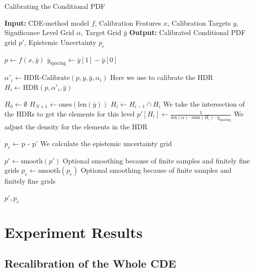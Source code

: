 \begin{algorithm}
    \caption{Calibrating the Conditional PDF}
    \label{alg:calibrate_pdf}
    \begin{algorithmic}
        \STATE \textbf{Input:} CDE-method model $f$, Calibration Features $x$, Calibration Targets $y$, Significance Level Grid $\alpha$, Target Grid $\bar{y}$
        \STATE \textbf{Output:} Calibrated Conditional PDF grid $p'$, Epistemic Uncertainty $p_e$
        
        \STATE $p \leftarrow f(x, \bar{y})$
        \STATE $\bar{y}_{\text{spacing}} \leftarrow \bar{y}[1] - \bar{y}[0]$

            \STATE $\alpha'_i \leftarrow \text{HDR-Calibrate}(p, y, \bar{y}, \alpha_i)$ Here we use  to calibrate the HDR
            \STATE $H_i \leftarrow \text{HDR}(p, \alpha'_i, \bar{y})$
        \ENDFOR

        \STATE $H_0 \leftarrow \emptyset$
        \STATE $H_{N+1} \leftarrow \text{ones}(\text{len}(\bar{y}))$
            \STATE $H_i \leftarrow H_{i - 1} \cap H_i$ We take the intersection of the HDRs to get the elements for this level
            \STATE $p'[H_i] \leftarrow \frac{1}{\text{len}(\alpha) \cdot \text{sum}(H_i) \cdot \bar{y}_{\text{spacing}}}$ We adjust the density for the elements in the HDR
        \ENDFOR
        
        \STATE $p_e \leftarrow \text{p - p'}$ We calculate the epistemic uncertainty grid

        \STATE $p' \leftarrow \text{smooth}(p')$ Optional smoothing because of finite samples and finitely fine grids
        \STATE $p_e \leftarrow \text{smooth}(p_e)$ Optional smoothing because of finite samples and finitely fine grids
        
        \RETURN $p', p_e$
    \end{algorithmic}
\end{algorithm}



\section{Experiment Results} \label{sec:results}

\subsection{Recalibration of the Whole CDE}

